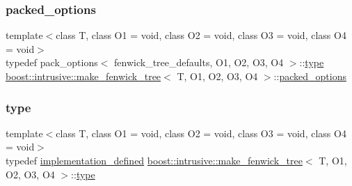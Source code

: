 \subsubsection{\texorpdfstring{packed\+\_\+options}{packed\_options}}
{\footnotesize\ttfamily template$<$class T, class O1 = void, class O2 = void, class O3 = void, class O4 = void$>$ \\
typedef pack\+\_\+options$<$ fenwick\+\_\+tree\+\_\+defaults, O1, O2, O3, O4 $>$\+::\hyperlink{structboost_1_1intrusive_1_1make__fenwick__tree_a174edb4a4fedde7b29f7aa9362d37ac0}{type} \hyperlink{structboost_1_1intrusive_1_1make__fenwick__tree}{boost\+::intrusive\+::make\+\_\+fenwick\+\_\+tree}$<$ T, O1, O2, O3, O4 $>$\+::\hyperlink{structboost_1_1intrusive_1_1make__fenwick__tree_affdbeb1683bbfebf917e9a35cbd31b81}{packed\+\_\+options}}

\mbox{\label{structboost_1_1intrusive_1_1make__fenwick__tree_a174edb4a4fedde7b29f7aa9362d37ac0}} 
\subsubsection{\texorpdfstring{type}{type}}
{\footnotesize\ttfamily template$<$class T, class O1 = void, class O2 = void, class O3 = void, class O4 = void$>$ \\
typedef \hyperlink{structboost_1_1intrusive_1_1make__fenwick__tree_af7a268a01bc7f0ae30cabfd6bf2be546}{implementation\+\_\+defined} \hyperlink{structboost_1_1intrusive_1_1make__fenwick__tree}{boost\+::intrusive\+::make\+\_\+fenwick\+\_\+tree}$<$ T, O1, O2, O3, O4 $>$\+::\hyperlink{structboost_1_1intrusive_1_1make__fenwick__tree_a174edb4a4fedde7b29f7aa9362d37ac0}{type}}

\mbox{\label{structboost_1_1intrusive_1_1make__fenwick__tree_a3ee00a7f2c43d65e29ad42d24f33235a}} 

